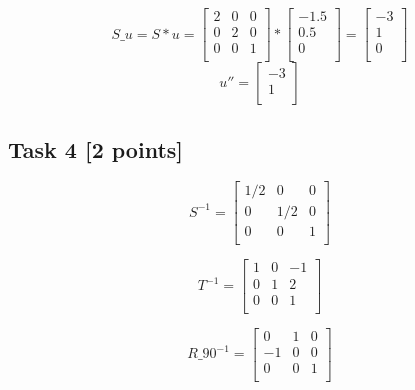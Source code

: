 \documentclass{article}
\begin{document}
\[
    S\_u = S * u =
    \begin{bmatrix}
        2 & 0 & 0 \\
        0 & 2 & 0 \\
        0 & 0 & 1 \\
    \end{bmatrix}
    *
    \begin{bmatrix}
        -1.5 \\
        0.5  \\
        0    \\
    \end{bmatrix}
    =
    \begin{bmatrix}
        -3 \\
        1  \\
        0  \\
    \end{bmatrix}
\]
\[
    u'' =
    \begin{bmatrix}
        -3 \\
        1  \\
    \end{bmatrix}
\]

\subsection*{Task 4 [2 points]}
\[
    S^{-1} =
    \begin{bmatrix}
        1/2 & 0   & 0 \\
        0   & 1/2 & 0 \\
        0   & 0   & 1 \\
    \end{bmatrix}
\]


\[
    T^{-1} =
    \begin{bmatrix}
        1 & 0 & -1 \\
        0 & 1 & 2  \\
        0 & 0 & 1  \\
    \end{bmatrix}
\]


\[
    R\_90^{-1} =
    \begin{bmatrix}
        0  & 1 & 0 \\
        -1 & 0 & 0 \\
        0  & 0 & 1 \\
    \end{bmatrix}
\]
\end{document}
